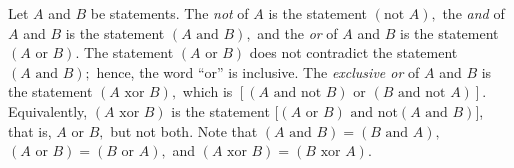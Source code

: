 Let $A$ and $B$ be statements.  %
%
%
The {\it not} of $A$ is the
statement $(\mbox{not } A),$ the {\it and} of $A$ and $B$ is the
statement
%
%
%
%
%
%
%
%
$(A\mbox{ and } B),$ and the {\it or} of $A$ and $B$ is the
statement $(A\mbox{ or } B).$
The statement $(A\mbox{ or } B)$ does
not contradict the statement $(A\mbox{ and } B);$ hence, the word ``or'' is
inclusive.
The {\it exclusive or} of $A$ and $B$ is the statement $(A\mbox{ xor } B),$
which is $[(A\mbox{ and not } B) \mbox{ or }(B\mbox{ and not } A)].$
%
Equivalently, $(A\mbox{ xor } B)$ is the statement [$(A\mbox{ or } B)\mbox{ and not}(A\mbox{ and }B)]$, that is, $A$ or $B,$ but not both.
%
Note that $(A\mbox{ and } B)= (B\mbox{ and } A),$  $(A\mbox{ or } B)= (B\mbox{ or } A),$ and $(A\mbox{ xor } B)= (B\mbox{ xor } A).$
